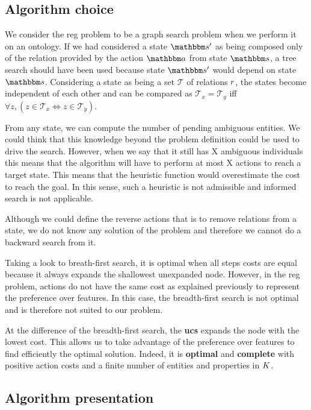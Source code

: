 \subsection{Algorithm choice}

We consider the \acrshort{reg} problem to be a graph search problem when we perform it on an ontology. If we had considered a state $\state'$ as being composed only of the relation provided by the action $\action$ from state $\state$, a tree search should have been used because state $\state'$ would depend on state $\state$. Considering a state as being a set $\mathcal{T}$ of relations $r$, the states become independent of each other and can be compared as $\mathcal{T}_x = \mathcal{T}_y$ iff $\forall{z},(z\in \mathcal{T}_x \Leftrightarrow z\in \mathcal{T}_y)$.

From any state, we can compute the number of pending ambiguous entities. We could think that this knowledge beyond the problem definition could be used to drive the search. However, when we say that it still has X ambiguous individuals this means that the algorithm will have to perform at most X actions to reach a target state. This means that the heuristic function would overestimate the cost to reach the goal. In this sense, such a heuristic is not admissible and informed search is not applicable.

Although we could define the reverse actions that is to remove relations from a state, we do not know any solution of the problem and therefore we cannot do a backward search from it.

Taking a look to breath-first search, it is optimal when all steps costs are equal because it always expands the shallowest unexpanded node. However, in the \acrshort{reg} problem, actions do not have the same cost as explained previously to represent the preference over features. In this case, the breadth-first search is not optimal and is therefore not suited to our problem.

At the difference of the breadth-first search, the \textbf{\acrfull{ucs}} expands the node with the lowest cost. This allows us to take advantage of the preference over features to find efficiently the optimal solution. Indeed, it is \textbf{optimal} and \textbf{complete} with positive action costs and a finite number of entities and properties in $K$.

\subsection{Algorithm presentation}

